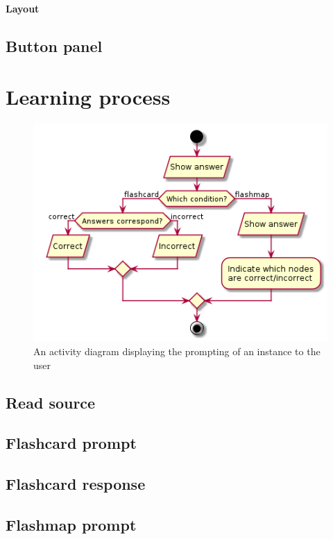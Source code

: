 \paragraph{Layout}

\subsection{Button panel}

\section{Learning process}

\begin{figure}
    \centering
    \includegraphics[width=.8\textwidth]{img/learningclient.png}
    \caption{An activity diagram displaying the prompting of an instance to the user}
    \label{fig:learningclient}
\end{figure}

\subsection{Read source}

\subsection{Flashcard prompt}

\subsection{Flashcard response}

\subsection{Flashmap prompt}


